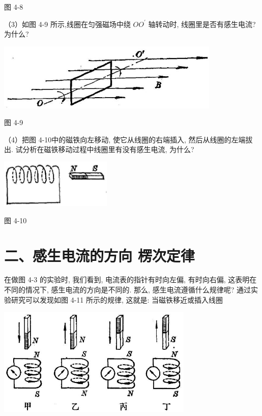 \documentclass[10pt]{article}
\begin{document}
图 4-8

（3）如图 4-9 所示,线圈在匀强磁场中绕 \(O{O}^{\prime }\) 轴转动时, 线圈里是否有感生电流? 为什么?

\begin{center}
\includegraphics[max width=0.8\textwidth]{images/01913056-1f15-74d8-9184-9aab52c9d66b_137_187428.jpg}
\end{center}

图 4-9

（4）把图 4-10中的磁铁向左移动, 使它从线圈的右端插入, 然后从线圈的左端拔出. 试分析在磁铁移动过程中线圈里有没有感生电流, 为什么?

\begin{center}
\includegraphics[max width=0.4\textwidth]{images/01913056-1f15-74d8-9184-9aab52c9d66b_137_220601.jpg}
\end{center}

图 4-10

\section*{二、感生电流的方向 楞次定律}

在做图 4-3 的实验时, 我们看到, 电流表的指针有时向左偏, 有时向右偏, 这表明在不同的情况下, 感生电流的方向是不同的. 那么, 感生电流遵循什么规律呢? 通过实验研究可以发现如图 4-11 所示的规律, 这就是: 当磁铁移近或插入线圈

\begin{center}
\includegraphics[max width=0.7\textwidth]{images/01913056-1f15-74d8-9184-9aab52c9d66b_138_902502.jpg}
\end{center}
\end{document}

